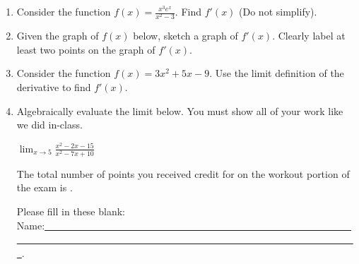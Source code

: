 \documentclass[11pt]{article}
\begin{document}
\begin{enumerate}
\vfill


\newpage
\begin{center}
{\Huge STOP!!  All of your answers up until this point need to be recorded on your scantron!}

{\small It is highly recommend that you record your answer on your exam as well but the answers marked on the scantron will take precedence if there is a discrepancy.
Please note that the total number of points you received credit for on the scantron portion of the exam will be posted on eCampus but not written on this exam when it is returned to you.}
\end{center}

\textbf{Part 2:  Workout Problems.}  You are required to show your work on these problems.  An answer with no work is unacceptable.  Please clearly box your final answer. Each problem is worth 10 points.
\item Consider the function $f(x)=\displaystyle\frac{x^3e^x}{x^2-3}$.  Find $f'(x)$ (Do not simplify).
\vfill
\item Given the graph of $f(x)$ below, sketch a graph of $f'(x)$.  Clearly label at least two points on the graph of $f'(x)$.

\begin{minipage}{3truein}
\end{minipage}
\hspace{.3truein}
\begin{minipage}{3truein}
\end{minipage}

\vfill

\newpage
\item Consider the function $f(x)=3x^2+5x-9$.  Use the limit definition of the derivative to find $f'(x)$.

\vfill

\item Algebraically evaluate the limit below.  You must show all of your work like we did in-class.

$\displaystyle\lim_{x\to 5} \displaystyle\frac{x^2-2x-15}{x^2-7x+10}$


\vfill
\hspace{.25truein}The total number of points you received credit for on the workout portion of the exam is \hspace{.1truein} .

\vspace{.1truein}
\hspace{.25truein}  Please fill in these blank: \hspace{.05truein} Name:\underline{~~~~~~~~~~~~~~~~~~~~~~~~~~~~~~~~~~~~~~~~~~~~~~~~~~~~~~~~~~~~~~~~~~~~~~~~~~~~~~~~~~~~~~~~~~~~~~~~~~~~~~~~~~~~~~~~~~~~~~~~~~~~~~~~~~~}.


\end{enumerate}
\end{document}
